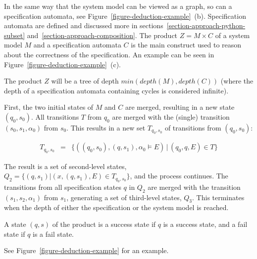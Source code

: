 In the same way that the system model can be viewed as a graph, so can a
specification automata, see Figure~\ref{figure-deduction-example}~(b).
Specification automata are defined and discussed more in
sections~\ref{section-approach-python-subset}
and~\ref{section-approach-composition}. The
product $Z = M \times C$ of a system model $M$ and a specification automata $C$
is the main construct used to reason about the correctness of the
specification. An example can be seen in
Figure~\ref{figure-deduction-example}~(c).

The product $Z$ will be a tree of depth $min(depth(M), depth(C))$ (where the
depth of a specification automata containing cycles is considered infinite).

First, the two initial states of $M$ and $C$ are merged, resulting in a new
state $(q_0,s_0)$. All transitions $T$ from $q_0$ are merged with the (single)
transition $(s_0, s_1, \alpha_0)$ from $s_0$. This results in a new set
$T_{q_0,s_0}$ of transitions from $(q_0,s_0)$:

\medskip
\[
  \begin{array}{rcl}
    T_{q_0,s_0} & = & \{((q_0,s_0), (q,s_1), \alpha_0 \models E) \, | \, (q_0, q, E) \in T \}
  \end{array}
\]
\medskip

The result is a set of second-level states, $Q_2 = \{(q,s_1) | (x, (q,s_1),
E) \in T_{q_0,s_0}\}$, and the process continues. The transitions from all
specification states $q$ in $Q_2$ are merged with the transition $(s_1, s_2,
\alpha_1)$ from $s_1$, generating a set of third-level states, $Q_3$. This
terminates when the depth of either the specification or the system model is
reached.

A state $(q, s)$ of the product is a success state if $q$ is a success state,
and a fail state if $q$ is a fail state.

See Figure~\ref{figure-deduction-example} for an example.


